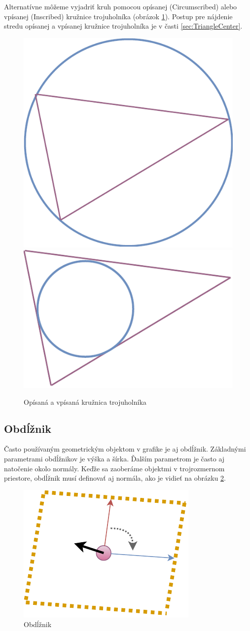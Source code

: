 Alternatívne môžeme vyjadriť kruh pomocou opísanej (Circumscribed) alebo vpísanej (Inscribed) kružnice trojuholníka (obrázok \ref{fig:SurfaceInscribed Circumscribed Circle}). Postup pre nájdenie stredu opísanej a vpísanej kružnice trojuholníka je v časti \ref{sec:TriangleCenter}.



\begin{figure}[H]
	\centering
	\includegraphics[height=0.3\textwidth]{obrazky-figures/Diagram/Draw/3Plane/DP Navrh operacii-2D - SurfaceCircumscribed Circle.pdf}
	\includegraphics[height=0.3\textwidth]{obrazky-figures/Diagram/Draw/3Plane/DP Navrh operacii-2D - SurfaceInscribed Circle.pdf}
	\caption{Opísaná a vpísaná kružnica trojuholníka}
	\label{fig:SurfaceInscribed Circumscribed Circle}
\end{figure}



\subsection*{Obdĺžnik}
Často používaným geometrickým objektom v grafike je aj obdĺžnik. Základnými parametrami obdĺžnikov je výška a šírka. Ďalším parametrom je často aj natočenie okolo normály. Keďže sa zaoberáme objektmi v trojrozmernom priestore, obdĺžnik musí definovať aj normála, ako je vidieť na obrázku \ref{fig:SurfaceCreate Rectangle}. 


\begin{figure}[H]
	\centering

	\includegraphics[height=0.3\textwidth]{obrazky-figures/Diagram/Draw/3Plane/DP Navrh operacii-2D - SurfaceCreate Rectangle.pdf}
	\caption{Obdĺžnik}
	\label{fig:SurfaceCreate Rectangle}
\end{figure}



